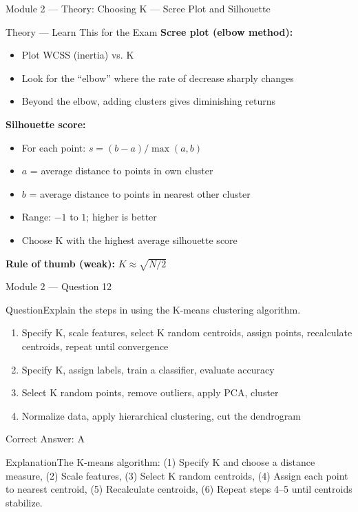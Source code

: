 \documentclass[aspectratio=169,10pt]{beamer}
\newcommand{\question}[1]{\begin{block}{Question}#1\end{block}}
\newcommand{\options}[4]{%
	\begin{enumerate}[label=\Alph*.,leftmargin=*]
		\item #1
		\item #2
		\item #3
		\item #4
	\end{enumerate}
}
\newcommand{\answerbox}[1]{\begin{exampleblock}{Correct Answer: #1}\end{exampleblock}}
\newcommand{\explain}[1]{\begin{block}{Explanation}#1\end{block}}
\newcommand{\theory}[1]{%
	\begin{block}{Theory --- Learn This for the Exam}
		\small #1
	\end{block}
}
\begin{document}
	\begin{frame}{Module 2 --- Theory: Choosing K --- Scree Plot and Silhouette}
		\theory{
			\textbf{Scree plot (elbow method):}
			\begin{itemize}
				\item Plot WCSS (inertia) vs. K
				\item Look for the ``elbow'' where the rate of decrease sharply changes
				\item Beyond the elbow, adding clusters gives diminishing returns
			\end{itemize}
			\textbf{Silhouette score:}
			\begin{itemize}
				\item For each point: $s = (b - a) / \max(a, b)$
				\item $a$ = average distance to points in own cluster
				\item $b$ = average distance to points in nearest other cluster
				\item Range: $-1$ to $1$; higher is better
				\item Choose K with the highest average silhouette score
			\end{itemize}
			\textbf{Rule of thumb (weak):} $K \approx \sqrt{N/2}$
		}
	\end{frame}
	
	\begin{frame}{Module 2 --- Question 12}
		\question{Explain the steps in using the K-means clustering algorithm.}
		\options{Specify K, scale features, select K random centroids, assign points, recalculate centroids, repeat until convergence}{Specify K, assign labels, train a classifier, evaluate accuracy}{Select K random points, remove outliers, apply PCA, cluster}{Normalize data, apply hierarchical clustering, cut the dendrogram}
		\answerbox{A}
		\explain{The K-means algorithm: (1) Specify K and choose a distance measure, (2) Scale features, (3) Select K random centroids, (4) Assign each point to nearest centroid, (5) Recalculate centroids, (6) Repeat steps 4--5 until centroids stabilize.}
	\end{frame}
	
\end{document}
